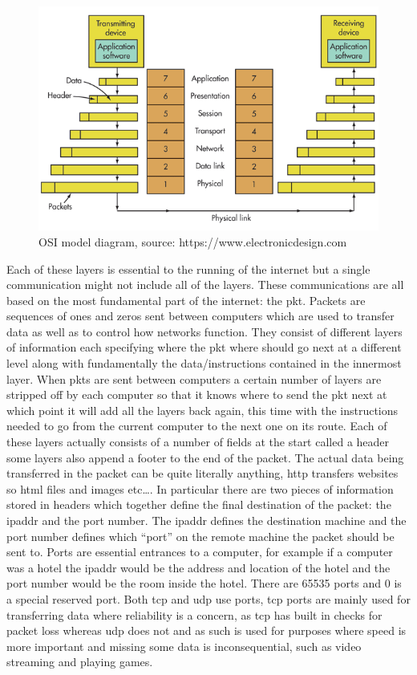 \documentclass[titlepage]{article}
\begin{document}
\begin{figure}[H]
  \centering
  \includegraphics[width=\textwidth]{screenshots/osi_model.png}
  \caption{%
    OSI model diagram, source: https://www.electronicdesign.com
  }\label{osi_model}
\end{figure}
Each of these layers is essential to the running of the internet but a single communication might 
not include all of the layers. These communications are all based on the most fundamental part of 
the internet: the \gls{pkt}. Packets are sequences of ones and zeros sent between computers which 
are used to transfer data as well as to control how networks function. They consist of different 
layers of information each specifying where the \gls{pkt} where should go next at a different level 
along with fundamentally the data/instructions contained in the innermost layer. When \glspl{pkt} 
are sent between computers a certain number of layers are stripped off by each computer so that it 
knows where to send the \gls{pkt} next at which point it will add all the layers back again, this 
time with the instructions needed to go from the current computer to the next one on its route. Each 
of these layers actually consists of a number of fields at the start called a \gls{header} some 
layers also append a footer to the end of the packet. The actual data being transferred in the 
packet can be quite literally anything, \gls{http} transfers websites so \gls{html} files and images 
etc\ldots. In particular there are two pieces of information stored in headers which together define 
the final destination of the packet: the \gls{ipaddr} and the \gls{port} number. The \gls{ipaddr} 
defines the destination machine and the \gls{port} number defines which ``port'' on the remote 
machine the packet should be sent to. Ports are essential entrances to a computer, for example if a 
computer was a hotel the \gls{ipaddr} would be the address and location of the hotel and the 
\gls{port} number would be the room inside the hotel. There are 65535 \glspl{port} and 0 is a 
special reserved port. Both \gls{tcp} and \gls{udp} use \glspl{port}, \gls{tcp} \glspl{port} are 
mainly used for transferring data where reliability is a concern, as \gls{tcp} has built in checks 
for packet loss whereas \gls{udp} does not and as such is used for purposes where speed is more 
important and missing some data is inconsequential, such as video streaming and playing games. 
\end{document}
